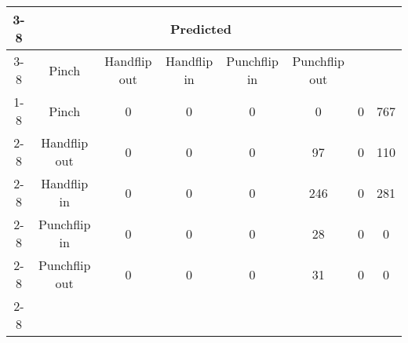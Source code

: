 \documentclass{standalone}
\begin{document}
 
 \begin{tabular}{|c |c |c |c |c |c |c |c |}
\cline{3-8}\multicolumn{2}{c|}{} & \multicolumn{6}{c|}{Predicted} \\ 
\cline{3-8} \multicolumn{2}{c |}{ } & Pinch & Handflip out & Handflip in & Punchflip in & Punchflip out\\ 
\cline{1-8}\multirow{6}{*}{\rotatebox[origin=c]{90}{Actual}} & Pinch & 0 & 0 & 0 & 0 & 0 & 767\\ 
 \cline{2-8} & Handflip out & 0 & 0 & 0 & 97 & 0 & 110\\ 
 \cline{2-8} & Handflip in & 0 & 0 & 0 & 246 & 0 & 281\\ 
 \cline{2-8} & Punchflip in & 0 & 0 & 0 & 28 & 0 & 0\\ 
 \cline{2-8} & Punchflip out & 0 & 0 & 0 & 31 & 0 & 0\\ 
 \cline{2-8}\hline \end{tabular}
 
\end{document}
